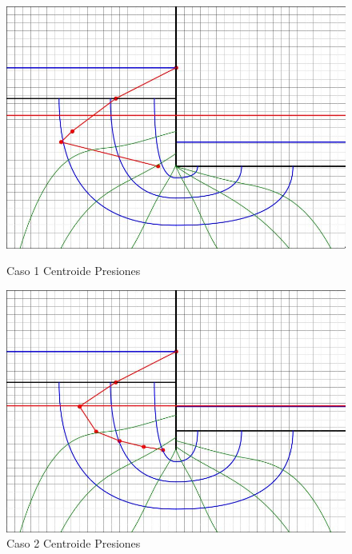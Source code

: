 \begin{figure}[H]
  \centering
  \begin{minipage}{0.32\textwidth}
      \centering
      \includegraphics[width=\textwidth]{FOTOS/caso_1_centroide_y.jpg}
      \caption{Caso 1 Centroide Presiones}
  \end{minipage}
  \begin{minipage}{0.32\textwidth}
      \centering
      \includegraphics[width=\textwidth]{FOTOS/caso_2_centroide_y.jpg}
      \caption{Caso 2 Centroide Presiones}
  \end{minipage}
  \begin{minipage}{0.32\textwidth}
      \centering

\end{minipage}
\end{figure}

